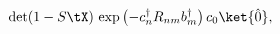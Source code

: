 \begin{equation} %
 \det(1-S\tX) \, \exp \left( -c^{\dagger}_nR_{nm}b_m^{\dagger}
 \right) c_0 \ket{\hat{0}}, 
\end{equation} 
